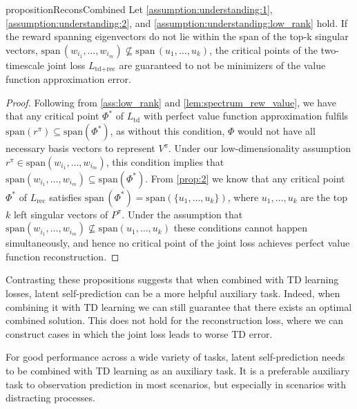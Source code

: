 \begin{restatable}{proposition}{ReconsCombined}
    Let \autoref{assumption:understanding:1}, \autoref{assumption:understanding:2}, and \autoref{assumption:understanding:low_rank} hold. If the reward spanning eigenvectors do not lie within the span of the top-k singular vectors, $\mathrm{span}\,(w_{i_1},\dots,w_{i_m}) \not\subseteq \mathrm{span}\,(u_1,\dots,u_k)$, the critical points of the two-timescale joint loss $L_{\text{td}+\text{rec}}$ are guaranteed to not be minimizers of the value function approximation error. 
\end{restatable}
\begin{proof}
    Following from \autoref{ass:low_rank} and \cref{lem:spectrum_rew_value}, we have that any critical point $\Phi^*$ of $L_\text{td}$ with perfect value function approximation fulfils $\mathrm{span}(r^\pi)\subseteq \mathrm{span}(\Phi^*)$, as without this condition, $\Phi$ would not have all necessary basis vectors to represent $V^\pi$. Under our low-dimensionality assumption $r^\pi \in \mathrm{span}(w_{i_1},\dots,w_{i_m})$, this condition implies that $\mathrm{span}(w_{i_1},\dots,w_{i_m})\subseteq \mathrm{span}(\Phi^*)$. From \cref{prop:2} we know that any critical point $\Phi^*$ of $L_\text{rec}$ satisfies $\mathrm{span}\,({\Phi^*})=\mathrm{span}\left(\{u_1,\dots,u_k\}\right)$, where $u_1,\dots,u_k$ are the top $k$ left singular vectors of $P^\pi$. Under the assumption that $\mathrm{span}(w_{i_1},\dots,w_{i_m}) \not\subseteq \mathrm{span}(u_1,\dots,u_k)$ these conditions cannot happen simultaneously, and hence no critical point of the joint loss achieves perfect value function reconstruction.
\end{proof}


Contrasting these propositions suggests that when combined with TD learning losses, latent self-prediction can be a more helpful auxiliary task. Indeed, when combining it with TD learning we can still guarantee that there exists an optimal combined solution.
This does not hold for the reconstruction loss, where we can construct cases in which the joint loss leads to worse TD error.

\begin{tcolorbox}[boxrule=0.2mm,colback=white,colframe=uoftblue,boxsep=0pt,top=3pt,bottom=5pt]
\begin{insight} 
For good performance across a wide variety of tasks, latent self-prediction needs to be combined with TD learning as an auxiliary task. It is a preferable auxiliary task to observation prediction in most scenarios, but especially in scenarios with distracting processes.
\label{insight:understanding:3}
\end{insight}
\end{tcolorbox}

